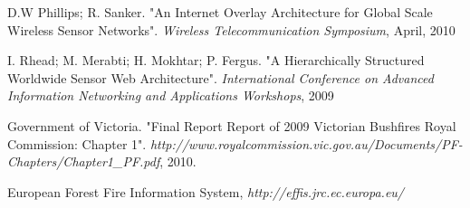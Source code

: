 \documentclass[onecolumn]{jaise2e}
\begin{document}
\begin{thebibliography}{0}
D.W Phillips; R. Sanker. "An Internet Overlay Architecture for Global Scale
Wireless Sensor Networks". {\em Wireless Telecommunication Symposium}, April, 2010

I. Rhead; M. Merabti; H. Mokhtar; P. Fergus. "A Hierarchically Structured Worldwide Sensor Web Architecture". {\em International Conference on Advanced Information Networking and Applications Workshops}, 2009

Government of Victoria. "Final Report Report of 2009 Victorian Bushfires Royal Commission: Chapter 1". {\em http://www.royalcommission.vic.gov.au/Documents/PF-Chapters/Chapter1\_PF.pdf}, 2010.

European Forest Fire Information System, {\em http://effis.jrc.ec.europa.eu/}
\end{thebibliography}
\end{document}
